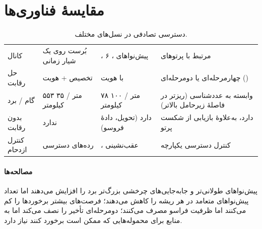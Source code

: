\documentclass[11pt,a4paper]{article}
\begin{document}
\section{مقایسهٔ فناوری‌ها}
\begin{table}[htbp]
\centering\small
\caption{دسترسی تصادفی در نسل‌های مختلف.}\label{tab:compare}
\begin{tabularx}{\linewidth}{@{}l Y Y Y@{}}
\toprule
{} &  &  &  \\
\midrule
کانال               & بُرست  روی یک شیار زمانی & ، ۶ ، پیش‌نواهای  &  مرتبط با پرتوهای  \\
حل رقابت            & تخصیص  + هویت           &  با هویت                 & چهارمرحله‌ای یا دومرحله‌ای () \\
گام / برد  & ۵۵۳ متر / ۳۵ کیلومتر                & ۷۸ متر / ۱۰۰ کیلومتر                   & وابسته به عدد‌شناسی (ریزتر در فاصلهٔ زیرحامل بالاتر) \\
بدون رقابت          & ندارد                               & دارد (تحویل، دادهٔ فروسو)              & دارد، به‌علاوهٔ بازیابی از شکست پرتو \\
کنترل ازدحام        & رده‌های دسترسی                      & ، عقب‌نشینی               & کنترل دسترسی یکپارچه \\
\bottomrule
\end{tabularx}
\end{table}

\paragraph{مصالحه‌ها} پیش‌نواهای طولانی‌تر و جابه‌جایی‌های چرخشی بزرگ‌تر برد را افزایش می‌دهند اما تعداد پیش‌نواهای
متعامد در هر ریشه را کاهش می‌دهند؛ فرصت‌های  بیشتر برخوردها را کم می‌کنند اما ظرفیت فراسو مصرف می‌کنند؛
 دومرحله‌ای تأخیر را نصف می‌کند اما به منابع  برای محموله‌هایی که ممکن است برخورد کنند نیاز دارد.

\end{document}
